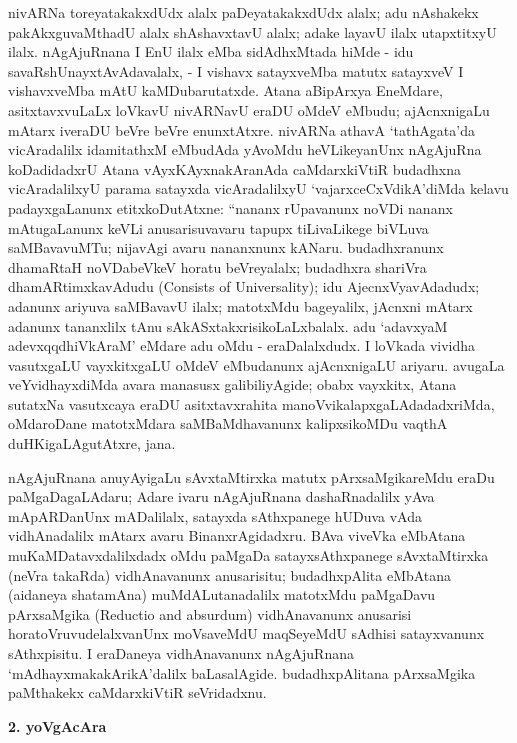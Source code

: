 nivARNa toreyatakakxdUdx alalx paDeyatakakxdUdx alalx; adu nAshakekx pakAkxgu\-vaMthadU alalx shAshavxtavU alalx; adake layavU ilalx utapxtitxyU ilalx. nAgAjuRnana I EnU ilalx eMba sidAdhxMtada hiMde - idu savaRshUnayxtAvAdavalalx, - I vishavx satayxveMba matutx satayxveV I vishavxveMba mAtU kaMDubarutatxde. Atana aBipArxya EneMdare, asitxtavxvuLaLx loVkavU nivARNavU eraDU oMdeV eMbudu; ajAcnxnigaLu mAtarx iveraDU beVre beVre enunxtAtxre. nivARNa athavA `tathAgata'da vicAradalilx idamitathxM eMbudAda yAvoMdu heVLikeyanUnx nAgAjuRna koDadidadxrU Atana vAyxKAyxnakAranAda caMdarxkiVtiR budadhxna vicAradalilxyU parama satayxda vicAradalilxyU `vajarxceCxVdikA'diMda kelavu padayxgaLanunx etitxkoDutAtxne: ``nananx rUpavanunx noVDi nananx mAtugaLanunx keVLi anusarisuvavaru tapupx tiLivaLikege biVLuva saMBavavuMTu; nijavAgi avaru nananxnunx kANaru. budadhxranunx dhamaRtaH noVDabeVkeV horatu beVreyalalx; budadhxra shariVra dhamARtimxkavAdudu {\rm (Consists of Universality)}; idu AjecnxVyavAdadudx; adanunx ariyuva saMBavavU ilalx; matotxMdu bageyalilx, jAcnxni mAtarx adanunx tananxlilx tAnu sAkASxtakxrisikoLaLxbalalx. adu `adavxyaM adevxqqdhiVkAraM' eMdare adu oMdu - eraDalalxdudx. I loVkada vividha vasutxgaLU vayxkitxgaLU oMdeV eMbudanunx ajAcnxnigaLU ariyaru. avugaLa veYvidhayxdiMda avara manasusx galibiliyAgide; obabx vayxkitx, Atana sutatxNa vasutxcaya eraDU asitxtavxrahita manoVvikalapxgaLAdadadxriMda, oMdaroDane matotxMdara saMBaMdhavanunx kalipxsikoMDu vaqthA duHKigaLAgutAtxre, jana.

nAgAjuRnana anuyAyigaLu sAvxtaMtirxka matutx pArxsaMgikareMdu eraDu paMgaDagaLAdaru; Adare ivaru nAgAjuRnana dashaRnadalilx yAva mApARDanUnx mADalilalx, satayxda sAthxpanege hUDuva vAda vidhAnadalilx mAtarx avaru BinanxrAgidadxru. BAva viveVka eMbAtana muKaMDatavxdalilxdadx oMdu paMgaDa satayxsAthxpanege sAvxtaMtirxka (neVra takaRda) vidhAnavanunx anusarisitu; budadhxpAlita eMbAtana (aidaneya shatamAna) muMdALutanadalilx matotxMdu paMgaDavu pArxsaMgika {\rm (Reductio and absurdum)} vidhAnavanunx anusarisi horatoVruvudelalxvanUnx moVsaveMdU maqSeyeMdU sAdhisi satayxvanunx sAthxpisitu. I eraDaneya vidhAnavanunx nAgAjuRnana `mAdhayxmakakArikA'dalilx baLasalAgide. budadhxpAlitana pArxsaMgika paMthakekx caMdarxkiVtiR seVridadxnu.

\begin{center}
{\textbf{\Large 2. yoVgAcAra}}
\end{center}

